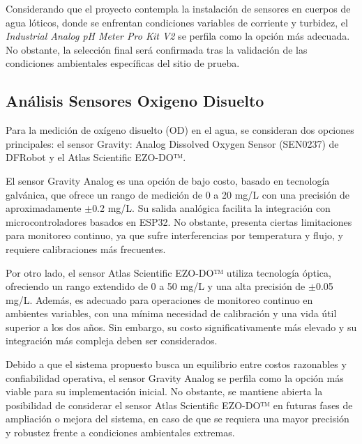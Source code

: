 Considerando que el proyecto contempla la instalación de sensores en cuerpos de agua lóticos, donde se enfrentan condiciones variables de corriente y turbidez, el \textit{Industrial Analog pH Meter Pro Kit V2} se perfila como la opción más adecuada. No obstante, la selección final será confirmada tras la validación de las condiciones ambientales específicas del sitio de prueba.

\subsection{Análisis Sensores Oxigeno Disuelto}
\label{subsec:analisis_sensores_oxigeno_disuelto}


Para la medición de oxígeno disuelto (OD) en el agua, se consideran dos opciones principales: el sensor Gravity: Analog Dissolved Oxygen Sensor (SEN0237) de DFRobot y el Atlas Scientific EZO-DO™.

El sensor Gravity Analog es una opción de bajo costo, basado en tecnología galvánica, que ofrece un rango de medición de 0 a 20 mg/L con una precisión de aproximadamente $\pm$0.2 mg/L. Su salida analógica facilita la integración con microcontroladores basados en ESP32. No obstante, presenta ciertas limitaciones para monitoreo continuo, ya que sufre interferencias por temperatura y flujo, y requiere calibraciones más frecuentes.

Por otro lado, el sensor Atlas Scientific EZO-DO™ utiliza tecnología óptica, ofreciendo un rango extendido de 0 a 50 mg/L y una alta precisión de $\pm$0.05 mg/L. Además, es adecuado para operaciones de monitoreo continuo en ambientes variables, con una mínima necesidad de calibración y una vida útil superior a los dos años. Sin embargo, su costo significativamente más elevado y su integración más compleja deben ser considerados.

Debido a que el sistema propuesto busca un equilibrio entre costos razonables y confiabilidad operativa, el sensor Gravity Analog se perfila como la opción más viable para su implementación inicial. No obstante, se mantiene abierta la posibilidad de considerar el sensor Atlas Scientific EZO-DO™ en futuras fases de ampliación o mejora del sistema, en caso de que se requiera una mayor precisión y robustez frente a condiciones ambientales extremas.

